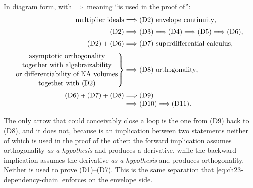In diagram form, with \(\Longrightarrow\) meaning ``is used in the proof
of'':
\begin{equation}\label{eq:ch27-dependency-diagram}
 \begin{aligned}
  \text{multiplier ideals}
   &\Longrightarrow \textup{(D2)}\ \text{envelope continuity},\\[2pt]
  \textup{(D2)}
   &\Longrightarrow \textup{(D3)}\Longrightarrow \textup{(D4)}
    \Longrightarrow \textup{(D5)}\Longrightarrow \textup{(D6)},\\[2pt]
  \textup{(D2)}+\textup{(D6)}
   &\Longrightarrow \textup{(D7)}\ \text{superdifferential calculus},\\[2pt]
  \left.
   \begin{gathered}
    \text{asymptotic orthogonality}\\[-2pt]
    \text{together with algebraizability}\\[-2pt]
    \text{or differentiability of NA volumes}\\[-2pt]
    \text{together with \textup{(D2)}}
   \end{gathered}
  \right\}
   &\Longrightarrow \textup{(D8)}\ \text{orthogonality},\\[2pt]
  \textup{(D6)}+\textup{(D7)}+\textup{(D8)}
   &\Longrightarrow \textup{(D9)}\\[-1mm]
   &\Longrightarrow \textup{(D10)}\Longrightarrow \textup{(D11)} .
 \end{aligned}
\end{equation}

The only arrow that could conceivably close a loop is the one from
\textup{(D9)} back to \textup{(D8)}, and it does not, because
 is an implication between two
statements neither of which is used in the proof of the other: the forward
implication assumes orthogonality \emph{as a hypothesis} and produces a
derivative, while the backward implication assumes the derivative
\emph{as a hypothesis} and produces orthogonality.  Neither is used to prove
\textup{(D1)}--\textup{(D7)}.  This is the same separation that
\eqref{eq:ch23-dependency-chain} enforces on the envelope side.

\begin{center}
\end{center}

